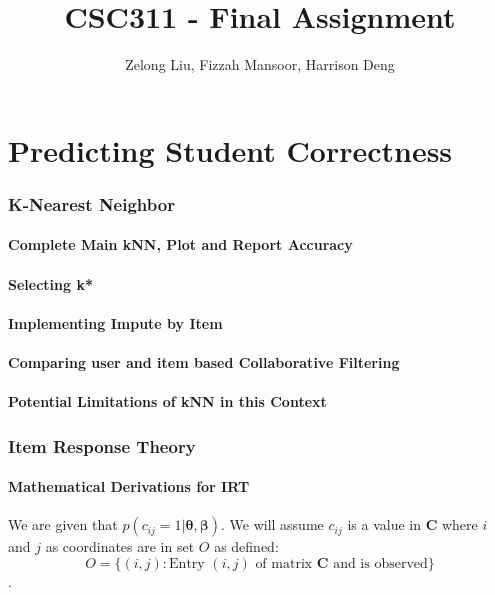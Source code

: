 \documentclass{article}
\title{CSC311 - Final Assignment}
\author{Zelong Liu, Fizzah Mansoor, Harrison Deng}
\begin{document}
    \maketitle

    \pagebreak

    \tableofcontents

    \pagebreak
    
    \part{Predicting Student Correctness}
    
    \section{K-Nearest Neighbor}
    \subsection{Complete Main kNN, Plot and Report Accuracy}
    \subsection{Selecting k*}
    \subsection{Implementing Impute by Item}
    \subsection{Comparing user and item based Collaborative Filtering}
    \subsection{Potential Limitations of kNN in this Context}

    \pagebreak

    \section{Item Response Theory}
    \subsection{Mathematical Derivations for IRT}
    We are given that $p(c_{ij} = 1 \vert \bm{\theta}, \bm{\beta})$. We will assume $c_{ij}$ is a value in $\bm{C}$ where $i$ and $j$ as coordinates are in set $O$ as defined:
    \[ O = \{(i,j): \text{Entry $(i,j)$ of matrix $\bm{C}$ and is observed}\} \].
\end{document}
